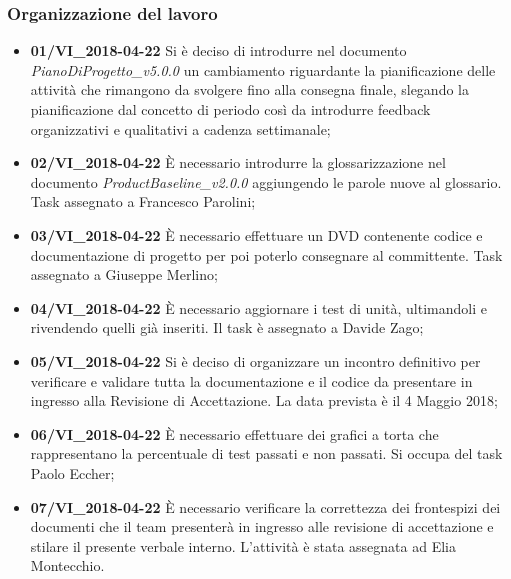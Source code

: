 \documentclass[a4paper, oneside, openany]{article}
\begin{document}
	\subsubsection{Organizzazione del lavoro}
    \begin{itemize}
    	
   \item  \textbf{ 01/VI\_2018-04-22 } Si è deciso di introdurre nel documento \emph{PianoDiProgetto\_v5.0.0 } un cambiamento riguardante la pianificazione delle attività che rimangono da svolgere fino alla consegna finale, slegando la pianificazione dal concetto di periodo così da introdurre feedback organizzativi e qualitativi a cadenza settimanale;   
   \item \textbf{ 02/VI\_2018-04-22 } È necessario introdurre la glossarizzazione nel documento \emph{ProductBaseline\_v2.0.0 } aggiungendo le parole nuove al glossario. Task assegnato a Francesco Parolini;
   \item \textbf{ 03/VI\_2018-04-22 } È necessario effettuare un DVD contenente codice e documentazione di progetto per poi poterlo consegnare al committente. Task assegnato a Giuseppe Merlino;
   \item \textbf{ 04/VI\_2018-04-22 } È necessario aggiornare i test di unità, ultimandoli e rivendendo quelli già inseriti. Il task è assegnato a Davide Zago;
   \item \textbf{ 05/VI\_2018-04-22 } Si è deciso di organizzare un incontro definitivo per verificare e validare tutta la documentazione e il codice da presentare in ingresso alla Revisione di Accettazione. La data prevista è il 4 Maggio 2018;
    \item \textbf{ 06/VI\_2018-04-22 } È necessario effettuare dei grafici a torta che rappresentano la percentuale di test passati e non passati. Si occupa del task Paolo Eccher;
    \item \textbf{ 07/VI\_2018-04-22 } È necessario verificare la correttezza dei frontespizi dei documenti che il team presenterà in ingresso alle revisione di accettazione e stilare il presente verbale interno. L'attività è stata assegnata ad Elia Montecchio.
     
   
   
   
   
   

  		  		
  
\end{itemize}
  

	
\end{document}
